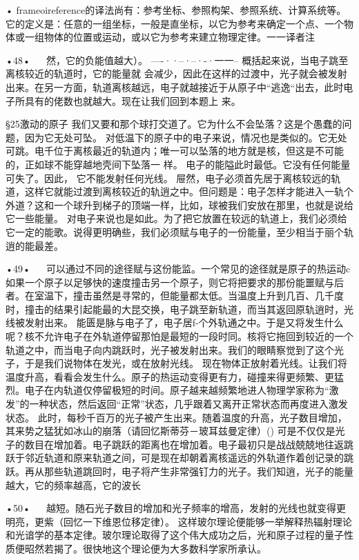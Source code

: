  

 
 
 

 
•	frameoireference的译法尚有：参考坐标、参照构架、参照系统、计算系统等。它的定义是：任意的一组坐标，一般是直坐标，以它为参考来确定一个点、一个物体或一组物体的位置或运动，或以它为参考来建立物理定律。一一译者注

•48•
  
然，它的负能值越大）。
----··--·--·-·一一--
概括起来说，当电子跳至离核较近的轨道时，它的能量就
会减少，因此在这样的过渡中，光子就会被发射出来。在另一方面，轨道离核越远，电子就越接近于从原子中“逃逸“出去，此时电子所具有的佬数也就越大。现在让我们回到本题上
来。

§25激动的原子
我们又要和那个球打交道了。它为什么不会坠落？这是个愚蠢的问题，因为它无处可坠。
对低温下的原子中的电子来说，情况也是类似的。它无处可跳。电千位于离核最近的轨道内；唯一可以坠落的地方就是核，但这是不可能的，正如球不能穿越地壳间下坠落一
样。
电子的能隘此时最低。它没有任何能量可失了。因此，
它不能发射任何光线。
屉然，电子必须首先居于离核较远的轨道，这样它就能过渡到离核较近的轨逍之中。但问题是：电子怎样才能进入一轨个外道？这和一个球升到梯子的顶端一样，比如，球被我们安放在那里，也就是说给它一些能量。
对电子来说也是如此。为了把它放置在较远的轨道上，我们必须给它一定的能歌。说得更明确些，我们必须赋与电子的一份能量，至少相当于丽个轨逍的能最差。

•49•
  
可以通过不同的途径赋与这份能监。一个常见的途径就是原子的热运动c如果一个原子以足够快的速度撞击另一个原子，则它将把要求的那份能噩赋与后者。在室温下，撞击虽然是寻常的，但能量都太低。当温度上升到几百、几千度时，撞击的结果引起能最的大昆交换，电子跳至新轨道，而当其返回原轨逍时，光线被发射出来。
能匮是脉与电子了，电子居f-个外轨通之中。于是又将发生什么呢？核不允许电子在外轨道停留那怕是最短的一段时同。核将它拖回到较近的一个轨道之中，而当电子向内跳跃时，光子被发射出来。我们的眼睛察觉到了这个光子，于是我们说物体在发光，或在放射光线。
现在物体正放射着光线。让我们将温度升高，看看会发生什么。原子的热运动变得更有力，碰撞来得更频繁、更猛烈。电子在内轨道仅停留极短的时间。原子越来越频繁地进人物理学家称为“激发”的一种状态，然后返回“正常”状态，几乎跟着又离开正常状态而再度进入激发状态。
此时，每秒千百万的光子被产生出来。随着温度的升高，光子数目增加，其来势之猛犹如冰山的崩落（请回忆斯蒂芬－玻耳兹曼定律）()
可是不仅仅是光子的数目在增加着。电子跳跃的距离也在增加着。电子最初只是战战兢兢地往返跳跃于邻近轨道和原来轨道之间，可是现在却朝着离核遥远的外轨道作着创记录的跳跃。再从那些轨道跳回时，电子将产生非常强钉力的光子。我们知逍，光子的能量越大，它的频率越高，它的波长

•50•
  
越短。随石光子数目的增加和光子频率的增高，发射的光线也就变得更明亮，更紫（回忆一下维恩位移定律）。
这样玻尔理论便能够一举解释热辐射理论和光谙学的基本定律。玻尔理论取得了这个伟大成功之后，光和原子过程的量子性质便昭然若揭了。很快地这个理论便为大多数科学家所承认。

